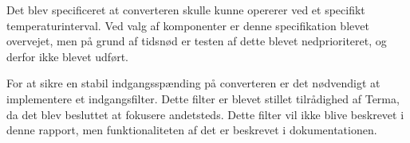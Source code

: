 Det blev specificeret at converteren skulle kunne opererer ved et specifikt temperaturinterval. Ved valg af komponenter er denne specifikation blevet overvejet, men på grund af tidsnød er testen af dette blevet nedprioriteret, og derfor ikke blevet udført.

For at sikre en stabil indgangsspænding på converteren er det nødvendigt at implementere et indgangsfilter. Dette filter er blevet stillet tilrådighed af Terma, da det blev besluttet at fokusere andetsteds. Dette filter vil ikke blive beskrevet i denne rapport, men funktionaliteten af det er beskrevet i dokumentationen.



